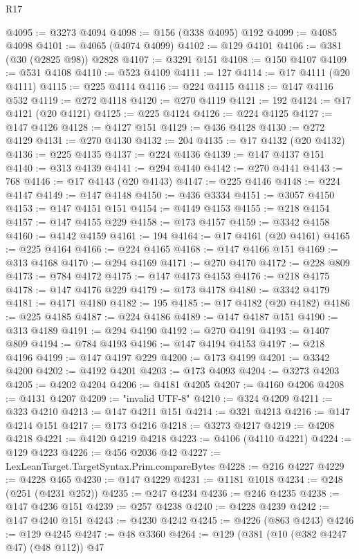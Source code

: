 \begin{lexlean}{R17}
\begin{coremodule}
@4095 := @3273 @4094
@4098 := @156 (@338 @4095) @192
@4099 := @4085 @4098
@4101 := @4065 (@4074 @4099)
@4102 := @129 @4101
@4106 := @381 (@30 (@2825 @98)) @2828
@4107 := @3291 @151
@4108 := @150 @4107
@4109 := @531 @4108
@4110 := @523 @4109
@4111 := 127
@4114 := @17 @4111 (@20 @4111)
@4115 := @225 @4114
@4116 := @224 @4115
@4118 := @147 @4116 @532
@4119 := @272 @4118
@4120 := @270 @4119
@4121 := 192
@4124 := @17 @4121 (@20 @4121)
@4125 := @225 @4124
@4126 := @224 @4125
@4127 := @147 @4126
@4128 := @4127 @151
@4129 := @436 @4128
@4130 := @272 @4129
@4131 := @270 @4130
@4132 := 204
@4135 := @17 @4132 (@20 @4132)
@4136 := @225 @4135
@4137 := @224 @4136
@4139 := @147 @4137 @151
@4140 := @313 @4139
@4141 := @294 @4140
@4142 := @270 @4141
@4143 := 768
@4146 := @17 @4143 (@20 @4143)
@4147 := @225 @4146
@4148 := @224 @4147
@4149 := @147 @4148
@4150 := @436 @3334
@4151 := @3057 @4150
@4153 := @147 @4151 @151
@4154 := @4149 @4153
@4155 := @218 @4154
@4157 := @147 @4155 @229
@4158 := @173 @4157
@4159 := @3342 @4158
@4160 := @4142 @4159
@4161 := 194
@4164 := @17 @4161 (@20 @4161)
@4165 := @225 @4164
@4166 := @224 @4165
@4168 := @147 @4166 @151
@4169 := @313 @4168
@4170 := @294 @4169
@4171 := @270 @4170
@4172 := @228 @809
@4173 := @784 @4172
@4175 := @147 @4173 @4153
@4176 := @218 @4175
@4178 := @147 @4176 @229
@4179 := @173 @4178
@4180 := @3342 @4179
@4181 := @4171 @4180
@4182 := 195
@4185 := @17 @4182 (@20 @4182)
@4186 := @225 @4185
@4187 := @224 @4186
@4189 := @147 @4187 @151
@4190 := @313 @4189
@4191 := @294 @4190
@4192 := @270 @4191
@4193 := @1407 @809
@4194 := @784 @4193
@4196 := @147 @4194 @4153
@4197 := @218 @4196
@4199 := @147 @4197 @229
@4200 := @173 @4199
@4201 := @3342 @4200
@4202 := @4192 @4201
@4203 := @173 @4093
@4204 := @3273 @4203
@4205 := @4202 @4204
@4206 := @4181 @4205
@4207 := @4160 @4206
@4208 := @4131 @4207
@4209 := "invalid UTF-8"
@4210 := @324 @4209
@4211 := @323 @4210
@4213 := @147 @4211 @151
@4214 := @321 @4213
@4216 := @147 @4214 @151
@4217 := @173 @4216
@4218 := @3273 @4217
@4219 := @4208 @4218
@4221 := @4120 @4219 @4218
@4223 := @4106 (@4110 @4221)
@4224 := @129 @4223
@4226 := @456 @2036 @42
@4227 := LexLeanTarget.TargetSyntax.Prim.compareBytes
@4228 := @216 @4227
@4229 := @4228 @465
@4230 := @147 @4229
@4231 := @1181 @1018
@4234 := @248 (@251 (@4231 @252))
@4235 := @247 @4234
@4236 := @246 @4235
@4238 := @147 @4236 @151
@4239 := @257 @4238
@4240 := @4228 @4239
@4242 := @147 @4240 @151
@4243 := @4230 @4242
@4245 := @4226 (@863 @4243)
@4246 := @129 @4245
@4247 := @48 @3360
@4264 := @129
    (@381
      (@10 (@382 @4247 @47) (@48 @112))
      @47

\end{coremodule}
\end{lexlean}
